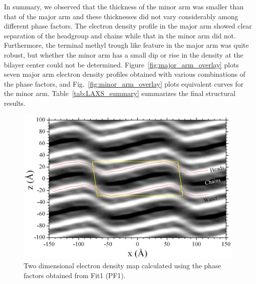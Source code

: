 In summary, we observed that the thickness of the minor arm was 
smaller than that of the major arm and these thicknesses did not vary 
considerably among different phase factors. 
The electron density profile in the major 
arm showed clear separation of the headgroup and chains while that in the minor 
arm did not. 
Furthermore, the terminal methyl trough like feature in the major arm was 
quite robust, but 
whether the minor arm has a small dip or rise in the density at the bilayer center
could not be determined. 
Figure~\ref{fig:major_arm_overlay} plots seven major arm electron density profiles 
obtained with various combinations of the phase factors, and
Fig.~\ref{fig:minor_arm_overlay} plots equivalent curves for the minor arm.
Table~\ref{tab:LAXS_summary} summarizes
the final structural results.

\begin{landscape}
\begin{figure}
  \centering
  \includegraphics[width=0.85\linewidth]{figures/ripple/LAXS/Fit1_2D_edp}
  \caption[]{Two dimensional electron density map calculated using the phase
  factors obtained from Fit1 (PF1).}
  \label{fig:PF1_2D_edp}
\end{figure}
\end{landscape}

